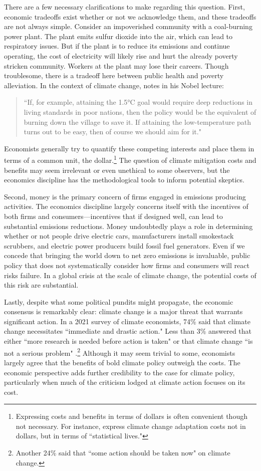 There are a few necessary clarifications to make regarding this question. First, economic tradeoffs exist whether or not we acknowledge them, and these tradeoffs are not always simple. Consider an impoverished community with a coal-burning power plant. The plant emits sulfur dioxide into the air, which can lead to respiratory issues. But if the plant is to reduce its emissions and continue operating, the cost of electricity will likely rise and hurt the already poverty stricken community. Workers at the plant may lose their careers. Though troublesome, there is a tradeoff here between public health and poverty alleviation. In the context of climate change, \cite{nordhaus2019climate} notes in his Nobel lecture:
\begin{quote}
	``If, for example, attaining the 1.5°C goal would require deep reductions in living standards in poor nations, then the policy would be the equivalent of burning down the village to save it. If attaining the low-temperature path turns out to be easy, then of course we should aim for it."
\end{quote}
Economists generally try to quantify these competing interests and place them in terms of a common unit, the dollar.\footnote{Expressing costs and benefits in terms of dollars is often  convenient though not necessary. For instance, \cite{carleton2020valuing} express climate change adaptation costs not in dollars, but in terms of ``statistical lives."} The question of climate mitigation costs and benefits may seem irrelevant or even unethical to some observers, but the economics discipline has the methodological tools to inform potential skeptics.

Second, money is the primary concern of firms engaged in emissions producing activities. The economics discipline largely concerns itself with the incentives of both firms and consumers---incentives that if designed well, can lead to substantial emissions reductions. Money undoubtedly plays a role in determining whether or not people drive electric cars, manufacturers install smokestack scrubbers, and electric power producers build fossil fuel generators. Even if we concede that bringing the world down to net zero emissions is invaluable, public policy that does not systematically consider how firms and consumers will react risks failure. In a global crisis at the scale of climate change, the potential costs of this risk are substantial. 

Lastly, despite what some political pundits might propagate, the economic consensus is remarkably clear: climate change is a major threat that warrants significant action. In a 2021 survey of climate economists, 74\% said that climate change necessitates ``immediate and drastic action." Less than 3\% answered that either ``more research is needed before action is taken" or that climate change ``is not a serious problem" \citep{howard2021gauging}.\footnote{Another 24\% said that ``some action should be taken now" on climate change.} Although it may seem trivial to some, economists largely agree that the benefits of bold climate policy outweigh the costs. The economic perspective adds further credibility to the case for climate policy, particularly when much of the criticism lodged at climate action focuses on its cost. 

